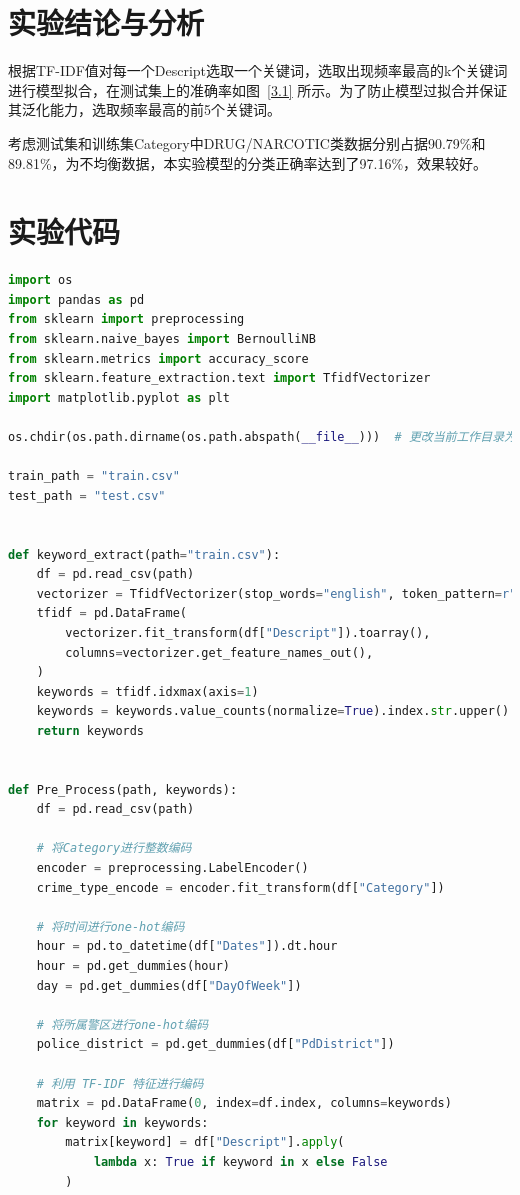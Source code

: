 \documentclass[a4paper,12pt]{report}
\begin{document}
\section{实验结论与分析}
\par 根据TF-IDF值对每一个Descript选取一个关键词，选取出现频率最高的k个关键词进行模型拟合，在测试集上的准确率如图~\ref{3.1} 所示。为了防止模型过拟合并保证其泛化能力，选取频率最高的前5个关键词。
\par 考虑测试集和训练集Category中DRUG/NARCOTIC类数据分别占据90.79\%和89.81\%，为不均衡数据，本实验模型的分类正确率达到了97.16\%，效果较好。
\section{实验代码}
\begin{lstlisting}[language=Python]
import os
import pandas as pd
from sklearn import preprocessing
from sklearn.naive_bayes import BernoulliNB
from sklearn.metrics import accuracy_score
from sklearn.feature_extraction.text import TfidfVectorizer
import matplotlib.pyplot as plt

os.chdir(os.path.dirname(os.path.abspath(__file__)))  # 更改当前工作目录为脚本所在目录

train_path = "train.csv"
test_path = "test.csv"


def keyword_extract(path="train.csv"):
    df = pd.read_csv(path)
    vectorizer = TfidfVectorizer(stop_words="english", token_pattern=r"(?u)\b\w+\b")
    tfidf = pd.DataFrame(
        vectorizer.fit_transform(df["Descript"]).toarray(),
        columns=vectorizer.get_feature_names_out(),
    )
    keywords = tfidf.idxmax(axis=1)
    keywords = keywords.value_counts(normalize=True).index.str.upper().tolist()
    return keywords


def Pre_Process(path, keywords):
    df = pd.read_csv(path)

    # 将Category进行整数编码
    encoder = preprocessing.LabelEncoder()
    crime_type_encode = encoder.fit_transform(df["Category"])

    # 将时间进行one-hot编码
    hour = pd.to_datetime(df["Dates"]).dt.hour
    hour = pd.get_dummies(hour)
    day = pd.get_dummies(df["DayOfWeek"])

    # 将所属警区进行one-hot编码
    police_district = pd.get_dummies(df["PdDistrict"])

    # 利用 TF-IDF 特征进行编码
    matrix = pd.DataFrame(0, index=df.index, columns=keywords)
    for keyword in keywords:
        matrix[keyword] = df["Descript"].apply(
            lambda x: True if keyword in x else False
        )


\end{lstlisting}
\end{document}
